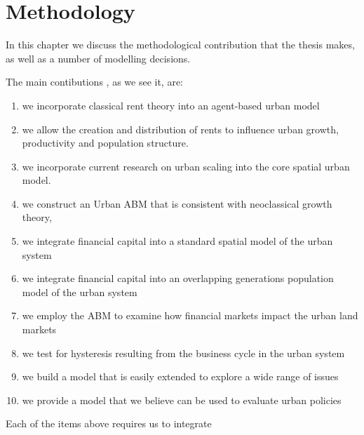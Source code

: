\chapter{Methodology} \label{chapter-methodology}

In this chapter we discuss the methodological contribution that the thesis makes, as well as a number of modelling decisions.

The main contibutions%
, as we see it, are:

\begin{enumerate}
    \item we incorporate classical rent theory into an agent-based urban model 
    \item we allow the creation and distribution of rents to influence urban growth, productivity and  population structure. 
    \item we incorporate current research on urban scaling into the  core spatial urban model.   
    \item we construct an   Urban ABM that is consistent with neoclassical growth theory,
    \item we integrate financial capital into a standard spatial model of the urban system
    \item we integrate financial capital into an overlapping generations population model of the urban system
    \item we employ the ABM to examine how financial markets impact the urban land markets 
    \item we test for hysteresis  resulting from the business cycle  in the urban system 
    \item we build a model that is easily extended to explore a wide range of issues
    \item we provide a model that we believe can be used  to evaluate urban policies
\end{enumerate}


Each of the items above requires us to  integrate 


